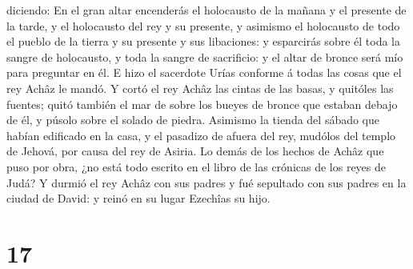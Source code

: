 diciendo: En el gran altar encenderás el holocausto de la mañana y el
presente de la tarde, y el holocausto del rey y su presente, y asimismo
el holocausto de todo el pueblo de la tierra y su presente y sus
libaciones: y esparcirás sobre él toda la sangre de holocausto, y toda
la sangre de sacrificio: y el altar de bronce será mío para preguntar en
él.  E hizo el sacerdote Urías conforme á todas las cosas
que el rey Achâz le mandó.  Y cortó el rey Achâz las cintas
de las basas, y quitóles las fuentes; quitó también el mar de sobre los
bueyes de bronce que estaban debajo de él, y púsolo sobre el solado de
piedra.  Asimismo la tienda del sábado que habían edificado
en la casa, y el pasadizo de afuera del rey, mudólos del templo de
Jehová, por causa del rey de Asiria.  Lo demás de los
hechos de Achâz que puso por obra, ¿no está todo escrito en el libro de
las crónicas de los reyes de Judá?  Y durmió el rey Achâz
con sus padres y fué sepultado con sus padres en la ciudad de David: y
reinó en su lugar Ezechîas su hijo.

\hypertarget{section-16}{%
\section{17}\label{section-16}}

